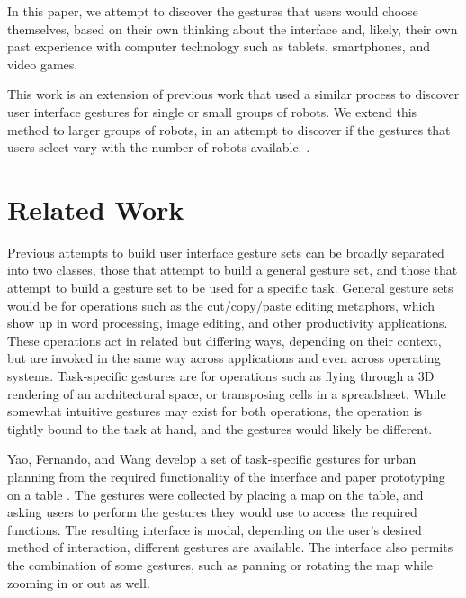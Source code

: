 \documentclass[]{article}
\begin{document}
In this paper, we attempt to discover the gestures that users would choose themselves, based on their own thinking about the interface and, likely, their own past experience with computer technology such as tablets, smartphones, and video games. 

This work is an extension of previous work that used a similar process to discover user interface gestures for single or small groups of robots. We extend this method to larger groups of robots, in an attempt to discover if the gestures that users select vary with the number of robots available. . 

\section{Related Work}

Previous attempts to build user interface gesture sets can be broadly separated into two classes, those that attempt to build a general gesture set, and those that attempt to build a gesture set to be used for a specific task. 
General gesture sets would be for operations such as the cut/copy/paste editing metaphors, which show up in word processing, image editing, and other productivity applications. 
These operations act in related but differing ways, depending on their context, but are invoked in the same way across applications and even across operating systems. 
Task-specific gestures are for operations such as flying through a 3D rendering of an architectural space, or transposing cells in a spreadsheet. 
While somewhat intuitive gestures may exist for both operations, the operation is tightly bound to the task at hand, and the gestures would likely be different. 

Yao, Fernando, and Wang develop a set of task-specific gestures for urban planning from the required functionality of the interface and paper prototyping on a table \cite{yao2012multi}. 
The gestures were collected by placing a map on the table, and asking users to perform the gestures they would use to access the required functions. 
The resulting interface is modal, depending on the user's desired method of interaction, different gestures are available. 
The interface also permits the combination of some gestures, such as panning or rotating the map while zooming in or out as well. 
\end{document}
